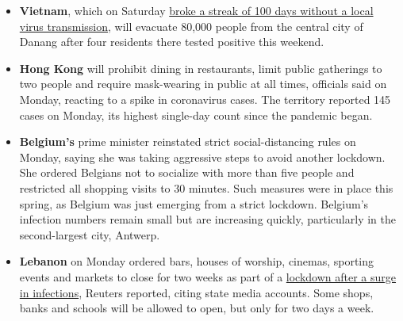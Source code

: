 \begin{itemize}
\item
  \textbf{Vietnam}, which on Saturday
  \href{https://www.nytimes.com/2020/07/25/world/asia/coronavirus-vietnam.html}{broke
  a streak of 100 days without a local virus transmission}, will
  evacuate 80,000 people from the central city of Danang after four
  residents there tested positive this weekend.
\item
  \textbf{Hong Kong} will prohibit dining in restaurants, limit public
  gatherings to two people and require mask-wearing in public at all
  times, officials said on Monday, reacting to a spike in coronavirus
  cases. The territory reported 145 cases on Monday, its highest
  single-day count since the pandemic began.
\item
  \textbf{Belgium's} prime minister reinstated strict social-distancing
  rules on Monday, saying she was taking aggressive steps to avoid
  another lockdown. She ordered Belgians not to socialize with more than
  five people and restricted all shopping visits to 30 minutes. Such
  measures were in place this spring, as Belgium was just emerging from
  a strict lockdown. Belgium's infection numbers remain small but are
  increasing quickly, particularly in the second-largest city, Antwerp.
\end{itemize}

\begin{itemize}
\tightlist
\item
  \textbf{Lebanon} on Monday ordered bars, houses of worship, cinemas,
  sporting events and markets to close for two weeks as part of a
  \href{https://www.reuters.com/article/us-health-coronavirus-lebanon/lebanon-reimposes-covid-19-restrictions-as-infections-spike-idUSKCN24S2FV?il=0}{lockdown
  after a surge in infections}, Reuters reported, citing state media
  accounts. Some shops, banks and schools will be allowed to open, but
  only for two days a week.
\end{itemize}

